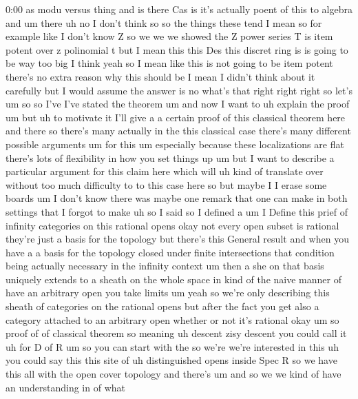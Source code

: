 \begin{unfinished}{0:00}
as  modu  versus  thing  and  is  there  Cas  is
it's  actually  poent  of  this  to  algebra
and  um  there  uh  no  I  don't  think  so  so
the  things  these  tend  I  mean  so  for
example  like  I  don't  know  Z  so  we  we  we
showed  the  Z  power  series  T  is  item
potent  over  z  polinomial  t  but  I  mean
this  this  Des  this  discret  ring  is  is
going  to  be  way
too  big  I  think  yeah  so  I  mean  like  this
is  not  going  to  be  item  potent  there's
no  extra  reason  why  this  should  be  I
mean  I  didn't  think  about  it  carefully
but  I  would  assume  the  answer  is
no  what's
that  right  right  right  so  let's  um  so  so
I've  I've  stated  the  theorem  um  and  now
I  want  to  uh  explain  the  proof
um  but  uh  to  motivate  it  I'll  give  a  a
certain  proof  of  this  classical  theorem
here  and  there  so  there's  many  actually
in  the  this  classical  case  there's  many
different  possible  arguments  um  for  this
um  especially  because  these
localizations  are  flat  there's  lots  of
flexibility  in  how  you  set  things  up  um
but  I  want  to  describe  a  particular
argument  for  this  claim  here  which  will
uh  kind  of  translate  over  without  too
much  difficulty  to  to  this  case  here  so
but  maybe  I  I  erase  some  boards  um  I
don't
know
there  was  maybe  one  remark  that  one  can
make  in  both  settings  that  I  forgot  to
make  uh  so  I  said  so  I  defined  a  um  I
Define  this  prief  of  infinity  categories
on  this  rational  opens  okay  not  every
open  subset  is  rational  they're  just  a
basis  for  the  topology  but  there's  this
General  result  and  when  you  have  a  a
basis  for  the  topology  closed  under
finite
intersections  that  condition  being
actually  necessary  in  the  infinity
context  um  then  a  she  on  that  basis
uniquely  extends  to  a  sheath  on  the
whole  space  in  kind  of  the  naive  manner
of  have  an  arbitrary  open  you  take
limits
um  yeah  so  we're  only  describing  this
sheath  of  categories  on  the  rational
opens  but  after  the  fact  you  get  also  a
category  attached  to  an  arbitrary  open
whether  or  not  it's
rational
okay  um  so  proof
of  of  classical  theorem
so
meaning  uh  descent  zisy  descent  you
could  call
it  uh  for  D  of
R  um  so  you  can  start  with  the  so  we're
we're  interested  in  this  uh  you  could
say  this  this  site  of  uh  distinguished
opens  inside  Spec  R  so  we  have
this
all  with  the  open  cover
topology  and  there's  um  and  so  we  we
kind  of  have  an  understanding  in  of  what

\end{unfinished}

